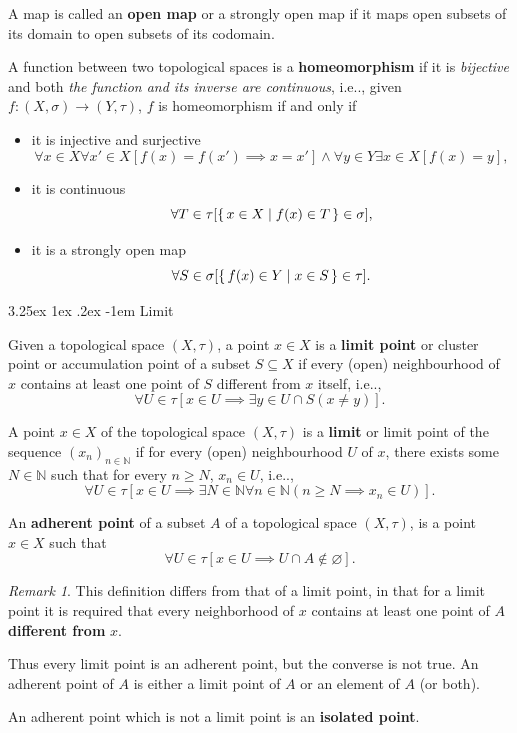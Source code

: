 \documentclass[12pt, letterpaper]{article}
\makeatletter
\renewcommand\subparagraph{\@startsection{subparagraph}{5}{\parindent}%
	{3.25ex \@plus1ex \@minus .2ex}%
	{0.75ex plus 0.1ex}%
	{\normalfont\normalsize\bfseries}}
\newcommand{\calS}{\mathcal{S}}
\newcommand{\calT}{\mathcal{T}}
\newcommand{\nat}{\mathbb{N}}
\newcommand\ie{i.e\@ifnextchar.{}{.\@}}
\renewcommand{\emptyset}{\varnothing}
\renewcommand\subparagraph{\@startsection{subparagraph}{5}{\parindent}%
	{3.25ex \@plus1ex \@minus .2ex}%
	{-1em}%
	{\normalfont\normalsize\bfseries}}
\theoremstyle{definition}
\theoremstyle{remark}
\newtheorem*{rem*}{Remark}
\theoremstyle{definition}
\theoremstyle{plain}
\numberwithin{equation}{section}
\makeatother
\begin{document}
	\begin{def*}
		A map is called an \textbf{open map} or a strongly open map
		if it maps open subsets of its domain to open subsets of its codomain.
	\end{def*}
	\begin{def*}[homeomorphism]
		A function between two topological spaces is a \textbf{homeomorphism} if it is \textit{bijective} 
		and both \textit{the function and its inverse are continuous}, \ie,
		given $f\colon (X,\sigma)\to(Y,\tau)$, $f$ is homeomorphism if and only if
		\begin{itemize}
			\item it is injective and surjective \[\forall x\in X\forall x'\in X[f(x)=f(x')\implies x=x']
			\land\forall y\in Y\exists x\in X[f(x)=y],\]
			\item it is continuous
			\[\forall T\in\tau[\set{x\in X|f(x)\in T}\in\sigma],\]
			\item it is a strongly open map
			\[\forall S\in\sigma[\set{f(x)\in Y|x\in S}\in\tau].\]
		\end{itemize}
	\end{def*}
	\subparagraph{Limit}
	\begin{def*}
		Given a topological space $(X,\tau)$, a point $x\in X$ is a \textbf{limit point}
		or cluster point or accumulation point of a subset $S\subseteq X$ if every (open) neighbourhood of $x$
		contains at least one point of $S$ different from $x$ itself, \ie,
		\[ \forall U\in\tau[x\in U\implies \exists y\in U\cap S(x\ne y) ] .\]
	\end{def*}
	\begin{def*}
		A point $x\in X$ of the topological space $(X, \tau)$ is a \textbf{limit} or limit point of the sequence $\left(x_{n}\right)_{n\in \nat }$
		if for every (open) neighbourhood $U$ of $x$,
		there exists some $N \in \nat$ such that for every $n\ge N$,
		$x_{n}\in U$, \ie,
		\[\forall U\in\tau[ x\in U \implies \exists N\in\nat\forall n\in\nat(n\ge N\implies x_n\in U) ] .\]
	\end{def*}

	\begin{def*}
		An \textbf{adherent point} of a subset $A$ of a topological space $(X,\tau)$,
		is a point $x \in X$
		such that
		\[ \forall U\in\tau [x\in U \implies U\cap A\notin \emptyset]. \]
	\end{def*}
	\begin{rem*}
		This definition differs from that of a limit point,
		in that for a limit point it is required that every neighborhood of $x$ contains at least one point of $A$
		\textbf{different from} $x$.
		
		Thus every limit point is an adherent point, but the converse is not true.
		An adherent point of $A$ is either a limit point of $A$ or an element of $A$ (or both).
	\end{rem*}
	\begin{def*}
		An adherent point which is not a limit point is an \textbf{isolated point}.
	\end{def*}
\end{document}
